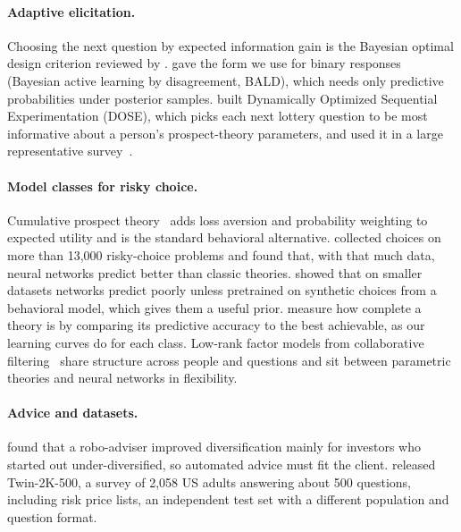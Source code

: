 \documentclass{article}
\begin{document}
\paragraph{Adaptive elicitation.}
Choosing the next question by expected information gain is the Bayesian optimal design criterion reviewed by \citet{chaloner1995}. \citet{houlsby2011} gave the form we use for binary responses (Bayesian active learning by disagreement, BALD), which needs only predictive probabilities under posterior samples. \citet{chapman2018dose} built Dynamically Optimized Sequential Experimentation (DOSE), which picks each next lottery question to be most informative about a person's prospect-theory parameters, and used it in a large representative survey~\citep{chapman2018econographics}.

\paragraph{Model classes for risky choice.}
Cumulative prospect theory~\citep{tversky1992} adds loss aversion and probability weighting to expected utility and is the standard behavioral alternative. \citet{peterson2021} collected choices on more than 13,000 risky-choice problems and found that, with that much data, neural networks predict better than classic theories. \citet{bourgin2019} showed that on smaller datasets networks predict poorly unless pretrained on synthetic choices from a behavioral model, which gives them a useful prior. \citet{fudenberg2022} measure how complete a theory is by comparing its predictive accuracy to the best achievable, as our learning curves do for each class. Low-rank factor models from collaborative filtering~\citep{koren2009} share structure across people and questions and sit between parametric theories and neural networks in flexibility.

\paragraph{Advice and datasets.}
\citet{dacunto2019} found that a robo-adviser improved diversification mainly for investors who started out under-diversified, so automated advice must fit the client. \citet{toubia2025} released Twin-2K-500, a survey of 2,058 US adults answering about 500 questions, including risk price lists, an independent test set with a different population and question format.
\end{document}
